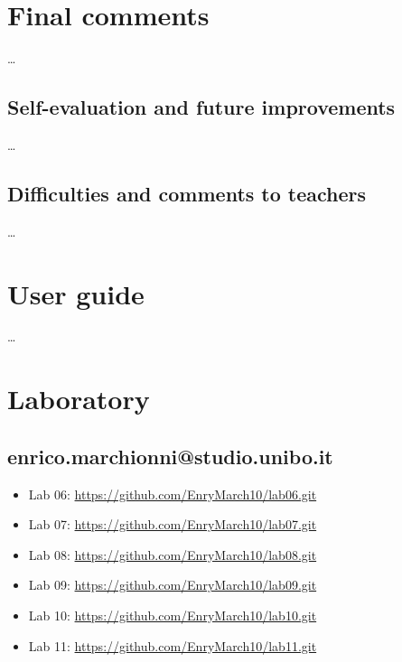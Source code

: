 \documentclass[12pt, a4paper]{report}
\begin{document}
\chapter{Final comments}

    \dots

\section{Self-evaluation and future improvements}

    \dots

\section{Difficulties and comments to teachers}

    \dots

\appendix

\chapter{User guide}

    \dots

\chapter{Laboratory}

\section{enrico.marchionni@studio.unibo.it}

\begin{itemize}
    \item Lab 06: \url{https://github.com/EnryMarch10/lab06.git}
    \item Lab 07: \url{https://github.com/EnryMarch10/lab07.git}
    \item Lab 08: \url{https://github.com/EnryMarch10/lab08.git}
    \item Lab 09: \url{https://github.com/EnryMarch10/lab09.git}
    \item Lab 10: \url{https://github.com/EnryMarch10/lab10.git}
    \item Lab 11: \url{https://github.com/EnryMarch10/lab11.git}
\end{itemize}

\printbibliography
\end{document}
